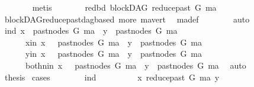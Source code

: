 \begin{isabellebody}
\ \ \ \ \ \ \isamarkupfalse%
\ metis\isanewline
\ \ \ \ \isamarkupfalse%
\ \isamarkupfalse%
\ red{\isacharunderscore}{\kern0pt}bd{\isacharcolon}{\kern0pt}\ {\isachardoublequoteopen}blockDAG\ {\isacharparenleft}{\kern0pt}reduce{\isacharunderscore}{\kern0pt}past\ G\ ma{\isacharparenright}{\kern0pt}{\isachardoublequoteclose}\ \ \isanewline
\ \ \ \ \ \ \isamarkupfalse%
\ blockDAG{\isachardot}{\kern0pt}reduce{\isacharunderscore}{\kern0pt}past{\isacharunderscore}{\kern0pt}dagbased\ more\ ma{\isacharunderscore}{\kern0pt}vert\ \isamarkupfalse%
\ ma{\isacharunderscore}{\kern0pt}def\isanewline
\ \ \ \ \ \ \isamarkupfalse%
\ auto\isanewline
\ \ \ \ \isamarkupfalse%
\ {\isacharparenleft}{\kern0pt}ind{\isacharparenright}{\kern0pt}\ {\isachardoublequoteopen}x\ {\isasymin}\ past{\isacharunderscore}{\kern0pt}nodes\ G\ ma\ {\isasymand}\ y\ {\isasymin}\ past{\isacharunderscore}{\kern0pt}nodes\ G\ ma{\isachardoublequoteclose}\isanewline
\ \ \ \ \ \ {\isacharbar}{\kern0pt}{\isacharparenleft}{\kern0pt}x{\isacharunderscore}{\kern0pt}in{\isacharparenright}{\kern0pt}\ {\isachardoublequoteopen}x\ {\isasymnotin}\ \ past{\isacharunderscore}{\kern0pt}nodes\ G\ ma\ {\isasymand}\ y\ {\isasymin}\ past{\isacharunderscore}{\kern0pt}nodes\ G\ ma{\isachardoublequoteclose}\isanewline
\ \ \ \ \ \ {\isacharbar}{\kern0pt}{\isacharparenleft}{\kern0pt}y{\isacharunderscore}{\kern0pt}in{\isacharparenright}{\kern0pt}\ {\isachardoublequoteopen}x\ {\isasymin}\ \ past{\isacharunderscore}{\kern0pt}nodes\ G\ ma\ {\isasymand}\ y\ {\isasymnotin}\ past{\isacharunderscore}{\kern0pt}nodes\ G\ ma{\isachardoublequoteclose}\isanewline
\ \ \ \ \ \ {\isacharbar}{\kern0pt}{\isacharparenleft}{\kern0pt}both{\isacharunderscore}{\kern0pt}nin{\isacharparenright}{\kern0pt}\ {\isachardoublequoteopen}x\ {\isasymnotin}\ \ past{\isacharunderscore}{\kern0pt}nodes\ G\ ma\ {\isasymand}\ y\ {\isasymnotin}\ past{\isacharunderscore}{\kern0pt}nodes\ G\ ma{\isachardoublequoteclose}\ \isamarkupfalse%
\ auto\isanewline
\ \ \ \ \isamarkupfalse%
\ \isamarkupfalse%
\ {\isacharquery}{\kern0pt}thesis\ \isamarkupfalse%
{\isacharparenleft}{\kern0pt}cases{\isacharparenright}{\kern0pt}\isanewline
\ \ \ \ \ \ \isamarkupfalse%
\ ind\isanewline
\ \ \ \ \ \ \isamarkupfalse%
\ \isamarkupfalse%
\ {\isachardoublequoteopen}x\ {\isasymrightarrow}\isactrlsup {\isacharplus}{\kern0pt}\isactrlbsub reduce{\isacharunderscore}{\kern0pt}past\ G\ ma\isactrlesub \ y{\isachardoublequoteclose}\ \isamarkupfalse%

\end{isabellebody}
